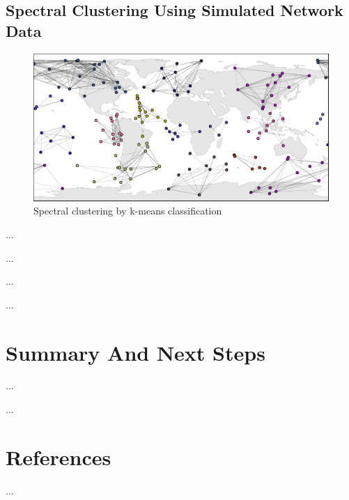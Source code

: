 \documentclass[conference]{IEEEtran}
\begin{document}
\subsection{Spectral Clustering Using Simulated Network Data}
\label{ssec:cluster}

\begin{figure}[t!]
  \centerline{\includegraphics[width=\linewidth]{images/clusters.pdf}}
  \caption{Spectral clustering by k-means classification}
  \label{fig:clusters}
\end{figure}

\vspace{80pt}

...

\vspace{80pt}

...

\vspace{80pt}

...

\vspace{80pt}

...

\vspace{80pt}


\section{Summary And Next Steps}
\label{sec:summary}

\vspace{80pt}

...

\vspace{80pt}

...

\vspace{80pt}


\section{References}
\label{sec:ref}

...
\end{document}
